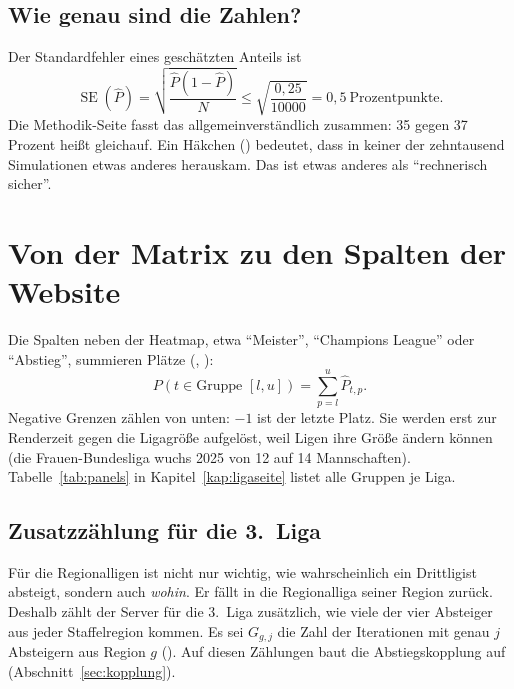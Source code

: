 \subsection*{Wie genau sind die Zahlen?}

Der Standardfehler eines geschätzten Anteils ist
\begin{equation}
  \operatorname{SE}(\hat P) = \sqrt{\frac{\hat P (1 - \hat P)}{N}} \le
  \sqrt{\frac{0{,}25}{\num{10000}}} = 0{,}5\ \text{Prozentpunkte}.
\end{equation}
Die Methodik-Seite fasst das allgemeinverständlich zusammen: 35 gegen 37
Prozent heißt gleichauf. Ein Häkchen (\checkmark) bedeutet, dass in keiner
der zehntausend Simulationen etwas anderes herauskam. Das ist etwas anderes
als \enquote{rechnerisch sicher}.

\section{Von der Matrix zu den Spalten der Website}

Die Spalten neben der Heatmap, etwa \enquote{Meister},
\enquote{Champions League} oder \enquote{Abstieg}, summieren Plätze
(, ):
\begin{equation}
  P(t \in \text{Gruppe } [l, u]) = \sum_{p=l}^{u} \hat P_{t,p}.
\end{equation}
Negative Grenzen zählen von unten: $-1$ ist der letzte Platz. Sie werden erst
zur Renderzeit gegen die Ligagröße aufgelöst, weil Ligen ihre Größe ändern
können (die Frauen-Bundesliga wuchs 2025 von 12 auf 14 Mannschaften).
Tabelle~\ref{tab:panels} in Kapitel~\ref{kap:ligaseite} listet alle Gruppen
je Liga.

\subsection*{Zusatzzählung für die 3.~Liga}

Für die Regionalligen ist nicht nur wichtig, wie wahrscheinlich ein
Drittligist absteigt, sondern auch \emph{wohin}. Er fällt in die Regionalliga
seiner Region zurück. Deshalb zählt der Server für die 3.~Liga zusätzlich,
wie viele der vier Absteiger aus jeder Staffelregion kommen. Es sei $G_{g,j}$
die Zahl der Iterationen mit genau $j$ Absteigern aus Region $g$
(). Auf diesen Zählungen baut die
Abstiegskopplung auf (Abschnitt~\ref{sec:kopplung}).
